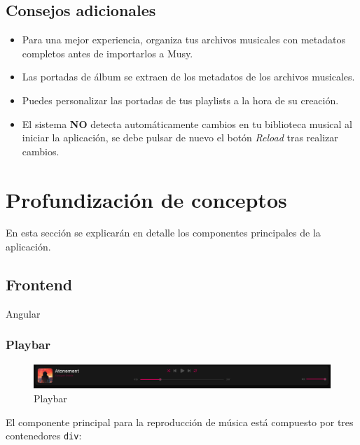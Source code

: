 \documentclass[11pt, a4paper]{article}
\begin{document}
  \subsection{Consejos adicionales}

  \begin{itemize}
    \item Para una mejor experiencia, organiza tus archivos musicales con metadatos completos antes de importarlos a Musy.
    \item Las portadas de álbum se extraen de los metadatos de los archivos musicales.
    \item Puedes personalizar las portadas de tus playlists a la hora de su creación.
    \item El sistema \textbf{NO} detecta automáticamente cambios en tu biblioteca musical al iniciar la aplicación, se debe pulsar de nuevo el botón \textit{Reload} tras realizar cambios.
  \end{itemize}
  
\section{Profundización de conceptos}

En esta sección se explicarán en detalle los componentes principales de la aplicación.

        \subsection{Frontend}

        Angular

            \subsubsection{Playbar}

            \begin{figure}[H]
                \centering
                \includegraphics[width=1\textwidth]{media/screenshots/playbar.png}
                \caption{Playbar}
                \label{fig:playbar}
            \end{figure}

            El componente principal para la reproducción de música está compuesto por tres contenedores \texttt{div}:
\end{document}
